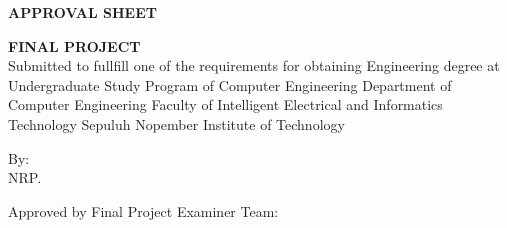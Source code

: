 \begin{center}
  \large
  \textbf{APPROVAL SHEET}
\end{center}

\thispagestyle{empty}

\begin{center}
  \textbf{\engtatitle{}}
\end{center}

\begingroup
\small


\begin{center}
  \textbf{FINAL PROJECT}
  \\Submitted to fullfill one of the requirements for obtaining Engineering degree at Undergraduate Study Program of Computer Engineering Department of Computer Engineering Faculty of Intelligent Electrical and Informatics Technology Sepuluh Nopember Institute of Technology
\end{center}


\begin{center}
  By: \name{}
  \\NRP. \nrp{}
\end{center}



\begin{center}
  Approved by Final Project Examiner Team:
\end{center}


\begingroup
\setlength{\tabcolsep}{0pt}

